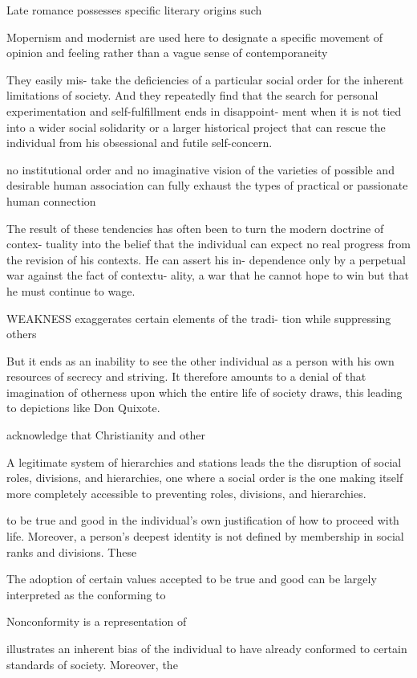 \documentclass[12pt,letterpaper]{article}
\begin{document}
Late romance possesses specific literary origins such


Mopernism and modernist are used here to designate a specific movement of opinion and feeling rather than a vague sense of contemporaneity

They easily mis- take the deficiencies of a particular social order for the inherent limitations of society. And they repeatedly find that the search for personal experimentation and self-fulfillment ends in disappoint- ment when it is not tied into a wider social solidarity or a larger historical project that can rescue the individual from his obsessional and futile self-concern.

no institutional order and no imaginative vision of the varieties of possible and desirable human association can fully exhaust the types of practical or passionate human connection

The result of these tendencies has often been to turn the modern doctrine of contex- tuality into the belief that the individual can expect no real progress from the revision of his contexts. He can assert his in- dependence only by a perpetual war against the fact of contextu- ality, a war that he cannot hope to win but that he must continue to wage.

WEAKNESS exaggerates certain elements of the tradi- tion while suppressing others

But it ends as an inability to see the other individual as a person with his own resources of secrecy and striving. It therefore amounts to a denial of that imagination of otherness upon which the entire life of society draws, this leading to depictions like Don Quixote.

 acknowledge that Christianity and other 

A legitimate system of hierarchies and stations leads the the disruption of social roles, divisions, and hierarchies, one where a social order is the one making itself more completely accessible to preventing roles, divisions, and hierarchies.  


to be true and good in the individual's own justification of how to proceed with life.  Moreover, a person's deepest identity is not defined by membership in social ranks and divisions.  These


The adoption of certain values accepted to be true and good can be largely interpreted as the conforming to 

Nonconformity is a representation of 

 illustrates an inherent bias of the individual to have already conformed to certain standards of society.  Moreover, the 
\end{document}
